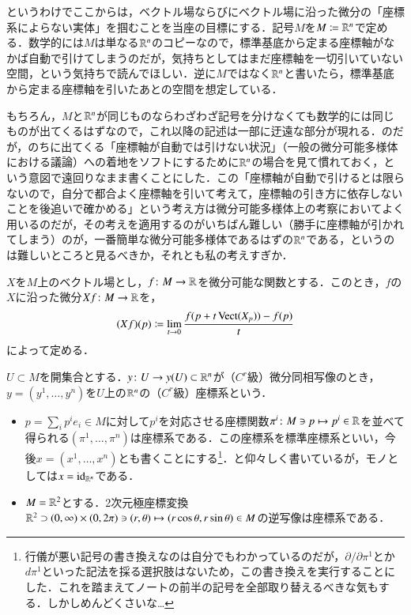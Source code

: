 というわけでここからは，ベクトル場ならびにベクトル場に沿った微分の「座標系によらない実体」を掴むことを当座の目標にする．記号$M$を$M \coloneqq \mathbb{R}^n$で定める．数学的には$M$は単なる$\mathbb{R}^n$のコピーなので，標準基底から定まる座標軸がなかば自動で引けてしまうのだが，気持ちとしてはまだ座標軸を一切引いていない空間，という気持ちで読んでほしい．逆に$M$ではなく$\mathbb{R}^n$と書いたら，標準基底から定まる座標軸を引いたあとの空間を想定している．

\begin{dig}
もちろん，$M$と$\mathbb{R}^n$が同じものならわざわざ記号を分けなくても数学的には同じものが出てくるはずなので，これ以降の記述は一部に迂遠な部分が現れる．のだが，のちに出てくる「座標軸が自動では引けない状況」（一般の微分可能多様体における議論）への着地をソフトにするために$\mathbb{R}^n$の場合を見て慣れておく，という意図で遠回りなまま書くことにした．この「座標軸が自動で引けるとは限らないので，自分で都合よく座標軸を引いて考えて，座標軸の引き方に依存しないことを後追いで確かめる」という考え方は微分可能多様体上の考察においてよく用いるのだが，その考えを適用するのがいちばん難しい（勝手に座標軸が引かれてしまう）のが，一番簡単な微分可能多様体であるはずの$\mathbb{R}^n$である，というのは難しいところと見るべきか，それとも私の考えすぎか．
\end{dig}

\begin{defi}
$X$を$M$上のベクトル場とし，$f \colon M \to \mathbb{R}$を微分可能な関数とする．このとき，$f$の$X$に沿った微分$Xf \colon M \to \mathbb{R}$を，
\begin{equation}
(Xf)(p) \coloneqq \lim_{t \to 0} \frac{f(p + t \operatorname{Vect}(X_p)) - f(p)}{t}
\end{equation}
によって定める．
\end{defi}

\begin{defi}
$U \subset M$を開集合とする．$y \colon U \to y(U) \subset \mathbb{R}^n$が（$C^r$級）微分同相写像のとき，$y = (y^1, \dots, y^n)$を$U$上の$\mathbb{R}^n$の（$C^r$級）座標系という．
\end{defi}

\begin{exm}[座標系の例]
\leavevmode
\begin{itemize}
\item $p = \sum_i p^i e_i \in M$に対して$p^i$を対応させる座標関数$\pi^i \colon M \ni p \mapsto p^i \in \mathbb{R}$を並べて得られる$(\pi^1, \dots, \pi^n)$は座標系である．この座標系を標準座標系といい，今後$x=(x^1, \dots, x^n)$とも書くことにする\footnote{行儀が悪い記号の書き換えなのは自分でもわかっているのだが，$\partial / \partial \pi ^1$とか$d\pi^1$といった記法を採る選択肢はないため，この書き換えを実行することにした．これを踏まえてノートの前半の記号を全部取り替えるべきな気もする．しかしめんどくさいな…}．と仰々しく書いているが，モノとしては$x = \operatorname{id}_{\mathbb{R}^n}$である．
\item $M = \mathbb{R}^2$とする．2次元極座標変換$\mathbb{R}^2 \supset (0, \infty) \times (0, 2\pi) \ni (r,\theta) \mapsto (r \cos \theta, r \sin \theta) \in M$の逆写像は座標系である．
\end{itemize}
\end{exm}

